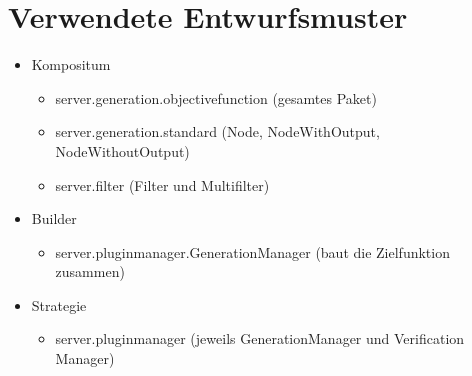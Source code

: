 \section{Verwendete Entwurfsmuster}
\begin{itemize}
	\item Kompositum
		\begin{itemize}
			\item server.generation.objectivefunction (gesamtes Paket)
			\item server.generation.standard (Node, NodeWithOutput, NodeWithoutOutput)
			\item server.filter (Filter und Multifilter)
		\end{itemize}
	\item Builder
		\begin{itemize}
			\item server.pluginmanager.GenerationManager (baut die Zielfunktion zusammen)
		\end{itemize}
	
	\item Strategie
		\begin{itemize}
			\item server.pluginmanager (jeweils GenerationManager und Verification Manager)
		\end{itemize}
\end{itemize}